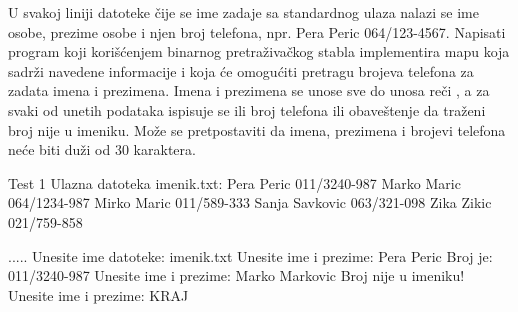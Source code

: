 \begin{Answer}[ref=702]
\end{Answer}


\begin{Exercise}[label=704]
U svakoj liniji datoteke čije se ime zadaje sa standardnog ulaza nalazi se ime osobe, prezime osobe i njen broj telefona, npr. Pera Peric 064/123-4567. Napisati program koji korišćenjem binarnog pretraživačkog stabla implementira mapu koja sadrži navedene informacije i koja će omogućiti pretragu brojeva telefona za zadata imena i prezimena. Imena i prezimena se unose sve do unosa reči , a za svaki od unetih podataka ispisuje se ili broj telefona ili obaveštenje da traženi broj nije u imeniku. Može se pretpostaviti da imena, prezimena i brojevi telefona neće biti duži od 30 karaktera.  

\begin{maxitest}
\begin{test}{Test 1}
Ulazna datoteka imenik.txt:
Pera Peric 011/3240-987
Marko Maric 064/1234-987
Mirko Maric 011/589-333
Sanja Savkovic 063/321-098
Zika Zikic 021/759-858

.....
Unesite ime datoteke: imenik.txt
Unesite ime i prezime: Pera Peric
Broj je: 011/3240-987
Unesite ime i prezime: Marko Markovic
Broj nije u imeniku!
Unesite ime i prezime: KRAJ
\end{test}
\end{maxitest}
\end{Exercise}

\begin{Answer}[ref=704]
\end{Answer}


